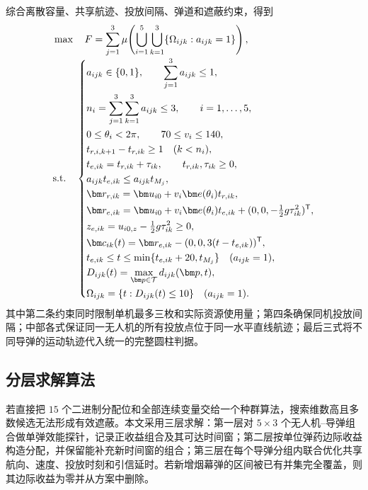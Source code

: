 综合离散容量、共享航迹、投放间隔、弹道和遮蔽约束，得到
\begin{equation}
\begin{aligned}
&\max\quad F=\sum_{j=1}^{3}\mu\!\left(
 \bigcup_{i=1}^{5}\bigcup_{k=1}^{3}\{\Omega_{ijk}:a_{ijk}=1\}\right),\\[-1mm]
&\text{\rm s.t.}\quad
\left\{\begin{aligned}
&a_{ijk}\in\{0,1\},\qquad \sum_{j=1}^{3}a_{ijk}\le1,\\
&n_i=\sum_{j=1}^{3}\sum_{k=1}^{3}a_{ijk}\le3,\qquad i=1,\ldots,5,\\
&0\le\theta_i<2\pi,\qquad70\le v_i\le140,\\
&t_{r,i,k+1}-t_{r,ik}\ge1\quad(k<n_i),\\
&t_{e,ik}=t_{r,ik}+\tau_{ik},\qquad t_{r,ik},\tau_{ik}\ge0,\\
&a_{ijk}t_{e,ik}\le a_{ijk}t_{M_j},\\
&\bm r_{r,ik}=\bm u_{i0}+v_i\bm e(\theta_i)t_{r,ik},\\
&\bm r_{e,ik}=\bm u_{i0}+v_i\bm e(\theta_i)t_{e,ik}
 +(0,0,-\tfrac12g\tau_{ik}^2)^{\mathsf T},\\
&z_{e,ik}=u_{i0,z}-\tfrac12g\tau_{ik}^2\ge0,\\
&\bm c_{ik}(t)=\bm r_{e,ik}-(0,0,3(t-t_{e,ik}))^{\mathsf T},\\
&t_{e,ik}\le t\le\min\{t_{e,ik}+20,t_{M_j}\}\quad(a_{ijk}=1),\\
&D_{ijk}(t)=\displaystyle\max_{\bm p\in\mathcal T}d_{ijk}(\bm p,t),\\
&\Omega_{ijk}=\{t:D_{ijk}(t)\le10\}\quad(a_{ijk}=1).
\end{aligned}\right.
\end{aligned}
\label{eq:q5-complete-model}
\end{equation}
其中第二条约束同时限制单机最多三枚和实际资源使用量；第四条确保同机投放间隔；中部各式保证同一无人机的所有投放点位于同一水平直线航迹；最后三式将不同导弹的运动轨迹代入统一的完整圆柱判据。

\subsection{分层求解算法}

若直接把 $15$ 个二进制分配位和全部连续变量交给一个种群算法，搜索维数高且多数候选无法形成有效遮蔽。本文采用三层求解：第一层对 $5\times3$ 个无人机--导弹组合做单弹效能探针，记录正收益组合及其可达时间窗；第二层按单位弹药边际收益构造分配，并保留能补充新时间窗的组合；第三层在每个导弹分组内联合优化共享航向、速度、投放时刻和引信延时。若新增烟幕弹的区间被已有并集完全覆盖，则其边际收益为零并从方案中删除。

